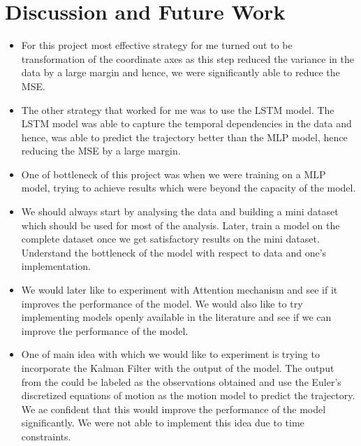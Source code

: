 \documentclass{article}
\begin{document}
\section{Discussion and Future Work}
\begin{itemize}
  \item For this project most effective strategy for me turned out to be transformation of the coordinate axes as this step reduced the 
  variance in the data by a large margin and hence, we were significantly able to reduce the MSE.
  \item The other strategy that worked for me was to use the LSTM model. The LSTM model was able to capture the temporal dependencies in the data and hence, was able to predict the trajectory better than the MLP model, hence reducing the MSE by a large margin.
  \item One of bottleneck of this project was when we were training on a MLP model, trying to achieve results which were beyond the capacity of the model. 
  \item We should always start by analysing the data and building a mini dataset which should be used for most of the analysis. Later, train a model on the complete dataset once we get satisfactory results on the mini dataset.
  Understand the bottleneck of the model with respect to data and one's implementation.
  \item We would later like to experiment with Attention mechanism and see if it improves the performance of the model. We would also like to try implementing 
  models openly available in the literature and see if we can improve the performance of the model.
  \item One of main idea with which we would like to experiment is trying to incorporate the Kalman Filter with the output of the model.
  The output from the could be labeled as the observations obtained and use the Euler's discretized equations of motion as the motion model to predict the trajectory.
  We ae confident that this would improve the performance of the model significantly. We were not able to implement this idea due to time constraints.
\end{itemize}
\end{document}
